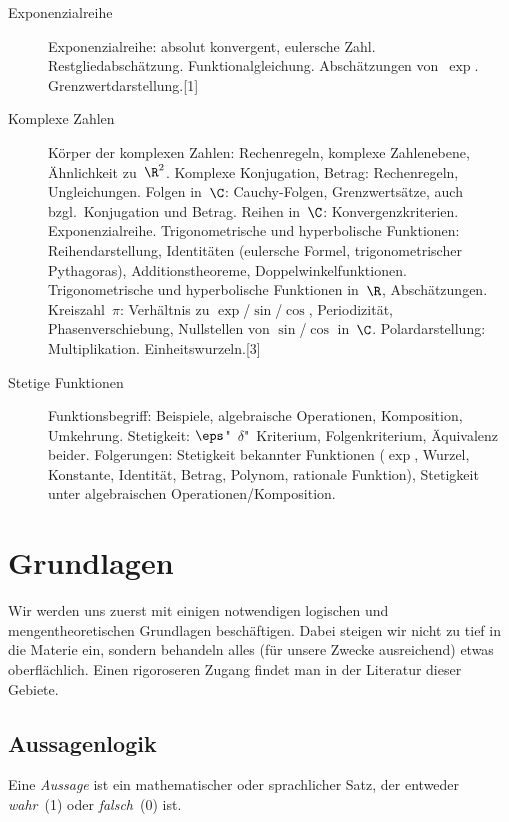 \documentclass[a4paper]{article}
\begin{document}
\begin{description}
    \item[Exponenzialreihe] Exponenzialreihe: absolut konvergent, eulersche Zahl. Restgliedabschätzung. Funktionalgleichung. Abschätzungen von~$\exp$. Grenzwertdarstellung.\hspace*{\fill}[1]
    \item[Komplexe Zahlen] Körper der komplexen Zahlen: Rechenregeln, komplexe Zahlenebene, Ähnlichkeit zu~$\R^2$. Komplexe Konjugation, Betrag: Rechenregeln, Ungleichungen. Folgen in~$\C$: Cauchy-Folgen, Grenzwertsätze, auch bzgl.\ Konjugation und Betrag. Reihen in~$\C$: Konvergenzkriterien. Exponenzialreihe. Trigonometrische und hyperbolische Funktionen: Reihendarstellung, Identitäten (eulersche Formel, trigonometrischer Pythagoras), Additionstheoreme, Doppelwinkelfunktionen. Trigonometrische und hyperbolische Funktionen in~$\R$, Abschätzungen. Kreiszahl~$\pi$: Verhältnis zu $\exp$/$\sin$/$\cos$, Periodizität, Phasenverschiebung, Nullstellen von $\sin$/$\cos$ in~$\C$. Polardarstellung: Multiplikation. Einheitswurzeln.\hspace*{\fill}[3]
    \item[Stetige Funktionen] Funktionsbegriff: Beispiele, algebraische Operationen, Komposition, Umkehrung. Stetigkeit: $\eps$"~$\delta$"~Kriterium, Folgenkriterium, Äquivalenz beider. Folgerungen: Stetigkeit bekannter Funktionen ($\exp$, Wurzel, Konstante, Identität, Betrag, Polynom, rationale Funktion), Stetigkeit unter algebraischen Operationen/Komposition.
\end{description}

\newpage\tableofcontents

\section{Grundlagen}

Wir werden uns zuerst mit einigen notwendigen logischen und mengentheoretischen Grundlagen beschäftigen. Dabei steigen wir nicht zu tief in die Materie ein, sondern behandeln alles (für unsere Zwecke ausreichend) etwas oberflächlich. Einen rigoroseren Zugang findet man in der Literatur dieser Gebiete.

\subsection{Aussagenlogik}

\begin{definition}[Aussage]
    Eine \emph{Aussage} ist ein mathematischer oder sprachlicher Satz, der entweder \emph{wahr}~(1) oder \emph{falsch}~(0) ist.
\end{definition}
\end{document}
